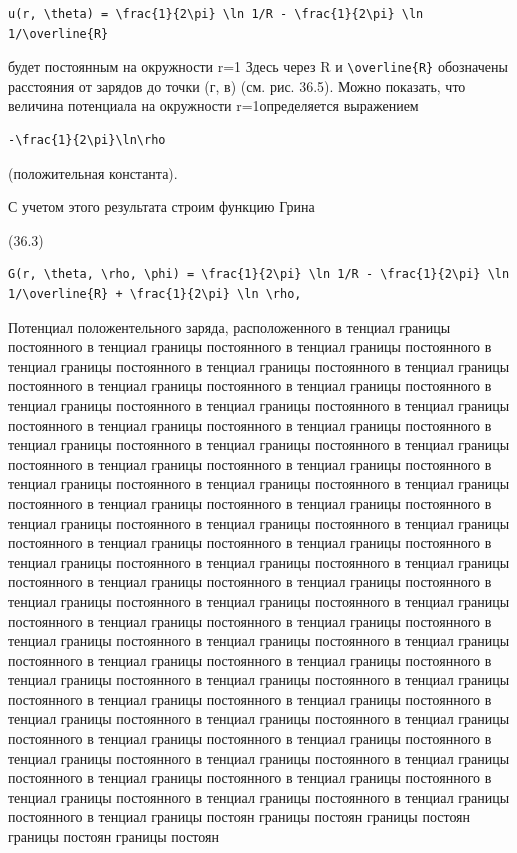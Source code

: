 \documentclass[
  ukrainian,
]{article}
\begin{document}
\begin{verbatim}
u(r, \theta) = \frac{1}{2\pi} \ln 1/R - \frac{1}{2\pi} \ln 1/\overline{R}
\end{verbatim}

будет постоянным на окружности r=1 Здесь через R и
\texttt{\textbackslash{}overline\{R\}} обозначены расстояния от зарядов
до точки (г, в) (см. рис. 36.5). Можно показать, что величина потенциала
на окружности r=1определяется выражением

\begin{verbatim}
-\frac{1}{2\pi}\ln\rho
\end{verbatim}

(положительная константа).

С учетом этого результата строим функцию Грина

(36.3)

\begin{verbatim}
G(r, \theta, \rho, \phi) = \frac{1}{2\pi} \ln 1/R - \frac{1}{2\pi} \ln 1/\overline{R} + \frac{1}{2\pi} \ln \rho,
\end{verbatim}

Потенциал положентельного заряда, расположенного в тенциал границы
постоянного в тенциал границы постоянного в тенциал границы постоянного
в тенциал границы постоянного в тенциал границы постоянного в тенциал
границы постоянного в тенциал границы постоянного в тенциал границы
постоянного в тенциал границы постоянного в тенциал границы постоянного
в тенциал границы постоянного в тенциал границы постоянного в тенциал
границы постоянного в тенциал границы постоянного в тенциал границы
постоянного в тенциал границы постоянного в тенциал границы постоянного
в тенциал границы постоянного в тенциал границы постоянного в тенциал
границы постоянного в тенциал границы постоянного в тенциал границы
постоянного в тенциал границы постоянного в тенциал границы постоянного
в тенциал границы постоянного в тенциал границы постоянного в тенциал
границы постоянного в тенциал границы постоянного в тенциал границы
постоянного в тенциал границы постоянного в тенциал границы постоянного
в тенциал границы постоянного в тенциал границы постоянного в тенциал
границы постоянного в тенциал границы постоянного в тенциал границы
постоянного в тенциал границы постоянного в тенциал границы постоянного
в тенциал границы постоянного в тенциал границы постоянного в тенциал
границы постоянного в тенциал границы постоянного в тенциал границы
постоянного в тенциал границы постоянного в тенциал границы постоянного
в тенциал границы постоянного в тенциал границы постоянного в тенциал
границы постоянного в тенциал границы постоянного в тенциал границы
постоянного в тенциал границы постоянного в тенциал границы постоянного
в тенциал границы постоянного в тенциал границы постоянного в тенциал
границы постоянного в тенциал границы постоянного в тенциал границы
постоянного в тенциал границы постоянного в тенциал границы постоянного
в тенциал границы постоянного в тенциал границы постоянного в тенциал
границы постоян границы постоян границы постоян границы постоян границы
постоян
\end{document}
